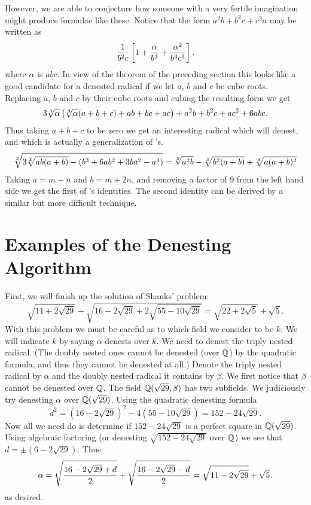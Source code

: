 However, we are able to conjecture how someone 
with a very fertile imagination might produce formulae like these.
Notice that the form $a^2 b + b^2 c + c^2 a$ may be written as 
\[
{1 \over b^2 c} \left[1 + {\alpha \over b^3} + {\alpha^2 \over b^3 c^3}
\right],
\]
where $\alpha$ is $a b c$.  In view of the theorem of the preceding
section this looks like a good candidate for a denested radical if we
let $a$, $b$ and $c$ be cube roots.  Replacing $a$, $b$ and $c$
by their cube roots and cubing the resulting form we get 
\[
3 \root 3 \of {\alpha}\left( \root 3 \of {\alpha}(a + b + c) +ab + bc +ac\right)
+ a^2b + b^2c +ac^2 + 6abc.
\]
Thus taking $a + b + c$ to be zero we get an interesting radical which will 
denest, and which is actually a generalization of {\Ramanujan}'s. 
\[
\root 3 \of {3 \root 3 \of {a b (a + b)} - (b^3 + 6 a b^2 + 3 b a^2 - a^3)} =
\root 3 \of {a^2 b} - \root 3 \of {b^2 (a + b)} + \root 3 \of {a (a + b)^2}
\]
Taking $a = m - n$ and $b = m + 2 n$, and removing a factor of $9$ from
the left hand side we get the first of {\Ramanujan}'s identities.  The
second identity can be derived by a similar but more difficult technique.

\section{Examples of the Denesting Algorithm}
\label{Denesting:Examples:Sec}

First, we will finish up the solution of Shanks' problem: 
\[
\sqrt{11 + 2 \sqrt{29}} + \sqrt{16 - 2 \sqrt{29} + 2 \sqrt{55 - 10
\sqrt{29}}}
= \sqrt{22 + 2 \sqrt{5}} + \sqrt{5}.
\]
With this problem we must be careful as to which field we consider to be
$k$.  We will indicate $k$ by saying $\alpha$ denests over $k$.
We need to denest the triply nested radical.  (The doubly nested ones cannot
be denested (over $\mathbb{Q}$) by the quadratic formula, and thus they
cannot be denested at all.)  Denote the triply nested radical by $\alpha$ and
the doubly nested radical it contains by $\beta$.  We first notice that
$\beta$ cannot be denested over $\mathbb{Q}$.  The field $\mathbb{Q}(\sqrt{29}, \beta)$
has two subfields.  We judiciously try denesting $\alpha$ over
$\mathbb{Q}(\sqrt{29})$.  Using the quadratic denesting formula 
\[
d^2 = (16 - 2\sqrt{29})^2 - 4 (55 - 10\sqrt{29}) = 
152 - 24 \sqrt{29}.
\]
Now all we need do is determine if $152 - 24\sqrt{29}$ is a perfect square
in $\mathbb{Q}(\sqrt{29})$.  Using algebraic factoring (or denesting
$\sqrt{152 - 24 \sqrt{29}}$ over $\mathbb{Q}$) we see that 
$d = \pm (6 - 2 \sqrt{29})$.  Thus 
\[
\alpha = \sqrt{16 - 2 \sqrt{29} + d \over 2} +
\sqrt{16 - 2 \sqrt{29} - d \over 2} = \sqrt{11 - 2 \sqrt{29}} + \sqrt{5}.
\]
as desired.


